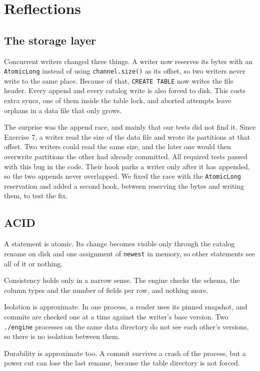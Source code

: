 \documentclass[11pt,a4paper,twocolumn]{article}
\begin{document}
\section{Reflections}
\label{sec:reflections}

\subsection{The storage layer}

Concurrent writers changed three things. A writer now reserves its bytes with an \texttt{AtomicLong} instead of using \texttt{channel.size()} as its offset, so two writers never write to the same place. Because of that, \texttt{CREATE TABLE} now writes the file header. Every append and every catalog write is also forced to disk. This costs extra syncs, one of them inside the table lock, and aborted attempts leave orphans in a data file that only grows.

The surprise was the append race, and mainly that our tests did not find it. Since Exercise 7, a writer read the size of the data file and wrote its partitions at that offset. Two writers could read the same size, and the later one would then overwrite partitions the other had already committed. All required tests passed with this bug in the code. Their hook parks a writer only after it has appended, so the two appends never overlapped. We fixed the race with the \texttt{AtomicLong} reservation and added a second hook, between reserving the bytes and writing them, to test the fix.

\subsection{ACID}

A statement is atomic. Its change becomes visible only through the catalog rename on disk and one assignment of \texttt{newest} in memory, so other statements see all of it or nothing.

Consistency holds only in a narrow sense. The engine checks the schema, the column types and the number of fields per row, and nothing more.

Isolation is approximate. In one process, a reader uses its pinned snapshot, and commits are checked one at a time against the writer's base version. Two \texttt{./engine} processes on the same data directory do not see each other's versions, so there is no isolation between them.

Durability is approximate too. A commit survives a crash of the process, but a power cut can lose the last rename, because the table directory is not forced.
\end{document}
